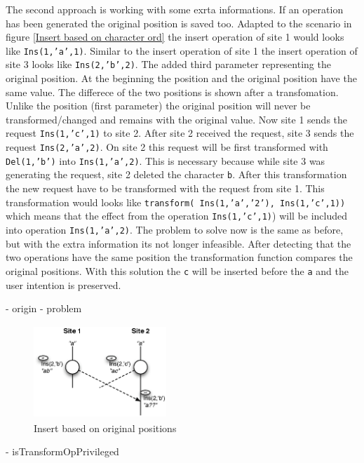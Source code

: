 \begin{itemize}
The second approach is working with some exrta informations. If an operation has been generated the original position is saved too. Adapted to the scenario in figure \ref{Insert based on character ord} the insert operation of site 1 would looks like \texttt{Ins(1,'a',1)}. Similar to the insert operation of site 1 the insert operation of site 3 looks like \texttt{Ins(2,'b',2)}. The added third parameter representing the original position. At the beginning the position and the original position have the same value. The differece of the two positions is shown after a transfomation. Unlike the position (first parameter) the original position will never be transformed/changed and remains with the original value.
Now site 1 sends the request \texttt{Ins(1,'c',1)} to site 2. After site 2 received the request, site 3 sends the request \texttt{Ins(2,'a',2)}. On site 2 this request will be first transformed with \texttt{Del(1,'b')} into \texttt{Ins(1,'a',2)}. This is necessary because while site 3 was generating the request, site 2 deleted the character \texttt{b}. After this transformation the new request have to be transformed with the request from site 1. This transformation would looks like \texttt{transform( Ins(1,'a','2'), Ins(1,'c',1))} which means that the effect from the operation \texttt{Ins(1,'c',1)}) will be included into operation \texttt{Ins(1,'a',2)}. The problem to solve now is the same as before, but with the extra information its not longer infeasible. After detecting that the two operations have the same position the transformation function compares the original positions. With this solution the \texttt{c} will be inserted before the \texttt{a} and the user intention is preserved.


  - origin
    - problem
\begin{figure}[H]
\centering
\includegraphics[height=3.5cm,width=5cm]{../../images/algo-impl/transform_ins_ins_origpos.eps}
\caption{Insert based on original positions}
\label{Insert based on original positions}
\end{figure}
  - isTransformOpPrivileged
\end{itemize}

